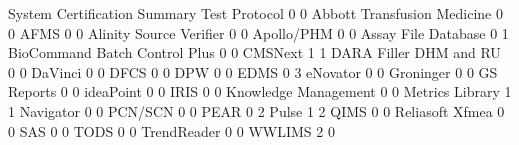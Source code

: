 \documentclass{article}
\begin{document}
\begin{Schunk}
\begin{Soutput}
                                System Certification Summary Test Protocol
                                                           0             0
  Abbott Transfusion Medicine                              0             0
  AFMS                                                     0             0
  Alinity Source Verifier                                  0             0
  Apollo/PHM                                               0             0
  Assay File Database                                      0             1
  BioCommand Batch Control Plus                            0             0
  CMSNext                                                  1             1
  DARA Filler DHM and RU                                   0             0
  DaVinci                                                  0             0
  DFCS                                                     0             0
  DPW                                                      0             0
  EDMS                                                     0             3
  eNovator                                                 0             0
  Groninger                                                0             0
  GS Reports                                               0             0
  ideaPoint                                                0             0
  IRIS                                                     0             0
  Knowledge Management                                     0             0
  Metrics Library                                          1             1
  Navigator                                                0             0
  PCN/SCN                                                  0             0
  PEAR                                                     0             2
  Pulse                                                    1             2
  QIMS                                                     0             0
  Reliasoft Xfmea                                          0             0
  SAS                                                      0             0
  TODS                                                     0             0
  TrendReader                                              0             0
  WWLIMS                                                   2             0
                               

\end{Soutput}
\end{Schunk}
\end{document}
